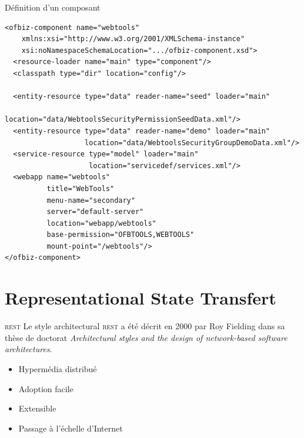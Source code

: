 \documentclass{beamer}
\begin{document}
\begin{frame}[fragile]{Définition d'un composant}
  \scriptsize
\begin{verbatim}
<ofbiz-component name="webtools"
    xmlns:xsi="http://www.w3.org/2001/XMLSchema-instance"
    xsi:noNamespaceSchemaLocation=".../ofbiz-component.xsd">
  <resource-loader name="main" type="component"/>
  <classpath type="dir" location="config"/>

  <entity-resource type="data" reader-name="seed" loader="main"
                   location="data/WebtoolsSecurityPermissionSeedData.xml"/>
  <entity-resource type="data" reader-name="demo" loader="main"
                   location="data/WebtoolsSecurityGroupDemoData.xml"/>
  <service-resource type="model" loader="main"
                    location="servicedef/services.xml"/>
  <webapp name="webtools"
          title="WebTools"
          menu-name="secondary"
          server="default-server"
          location="webapp/webtools"
          base-permission="OFBTOOLS,WEBTOOLS"
          mount-point="/webtools"/>
</ofbiz-component>
\end{verbatim}
\end{frame}

\section{Representational State Transfert}

\begin{frame}{\textsc{rest}}
  Le style architectural \textsc{rest} a été décrit en 2000 par Roy
  Fielding dans sa thèse de doctorat \emph{Architectural styles and
    the design of network-based software architectures}.

  \begin{itemize}
  \item Hypermédia distribué
  \item Adoption facile
  \item Extensible
  \item Passage à l'échelle d'Internet
  \end{itemize}
\end{frame}
\end{document}
